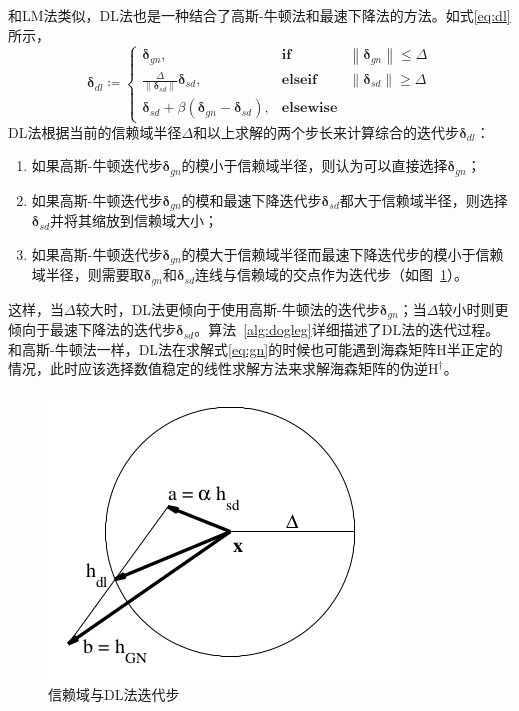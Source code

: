 和LM法类似，DL法也是一种结合了高斯-牛顿法和最速下降法的方法。如式\eqref{eq:dl}所示，
\begin{equation}
    \bm{\delta}_{dl} \coloneqq \left\{
        \begin{array}{lll}
            \bm{\delta}_{gn}, & \textbf{if} & \left\|\bm{\delta}_{gn}\right\| \leq \Delta \\
            \frac{\Delta}{\left\|\bm{\delta}_{sd}\right\|}\bm{\delta}_{sd}, &
            \textbf{elseif} & \left\|\bm{\delta}_{sd}\right\| \geq \Delta \\
            \bm{\delta}_{sd} + \beta(\bm{\delta}_{gn}-\bm{\delta}_{sd}), & \textbf{elsewise}
        \end{array}
    \right.
    \label{eq:dl}
\end{equation}
DL法根据当前的信赖域半径$\Delta$和以上求解的两个步长来计算综合的迭代步$\bm{\delta}_{dl}$：
\begin{enumerate}
    \item 如果高斯-牛顿迭代步$\bm{\delta}_{gn}$的模小于信赖域半径，则认为可以直接选择$\bm{\delta}_{gn}$；
    \item 如果高斯-牛顿迭代步$\bm{\delta}_{gn}$的模和最速下降迭代步$\bm{\delta}_{sd}$都大于信赖域半径，则选择$\bm{\delta}_{sd}$并将其缩放到信赖域大小；
    \item 如果高斯-牛顿迭代步$\bm{\delta}_{gn}$的模大于信赖域半径而最速下降迭代步的模小于信赖域半径，则需要取$\bm{\delta}_{gn}$和$\bm{\delta}_{sd}$连线与信赖域的交点作为迭代步（如图~\ref{fig:dogleg_step}）。
\end{enumerate}
这样，当$\Delta$较大时，DL法更倾向于使用高斯-牛顿法的迭代步$\bm{\delta}_{gn}$；当$\Delta$较小时则更倾向于最速下降法的迭代步$\bm{\delta}_{sd}$。算法~\ref{alg:dogleg}详细描述了DL法的迭代过程。和高斯-牛顿法一样，DL法在求解式\eqref{eq:gn}的时候也可能遇到海森矩阵$\mathrm{H}$半正定的情况，此时应该选择数值稳定的线性求解方法来求解海森矩阵的伪逆$\mathrm{H}^\dag$。

\begin{figure}[htb!]
    \centering
    \includegraphics[width=.3\textwidth]{Pictures/dogleg_step.png}
    \caption{信赖域与DL法迭代步\citep{tingleff2004methods}}
    \label{fig:dogleg_step}
\end{figure}

